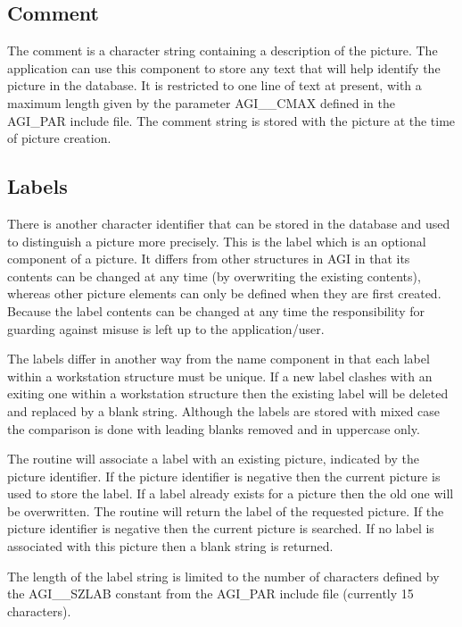 \documentclass[twoside,11pt]{starlink}
\begin{document}
\subsection{Comment}
The comment is a character string containing a description of the
picture. The application can use this component to store any text that
will help identify the picture in the database.
It is restricted to one line of text at present, with a maximum length
given by the parameter AGI\_\_CMAX defined in the AGI\_PAR include file.
The comment string is stored with the picture at the time of picture creation.

\subsection{Labels}\label{lab}
There is another character identifier that can be stored in the database
and used to distinguish a picture more precisely. This is the label which
is an optional component of a picture.
It differs from other structures in AGI in that its contents can be
changed at any time (by overwriting the existing contents), whereas
other picture elements can only be defined when they are first created.
Because the label contents can be changed at any time the responsibility
for guarding against misuse is left up to the application/user.

The labels differ in another way from the name component in that each
label within a workstation structure must be unique. If a new label clashes
with an exiting one within a workstation structure then the existing label
will be deleted and replaced by a blank string. Although the labels are
stored with mixed case the comparison is done with leading blanks removed
and in uppercase only.

The routine 
will associate a label with an existing picture,
indicated by the picture identifier. If the picture identifier is negative
then the current picture is used to store the label. If a label already
exists for a picture then the old one will be overwritten.
The routine 
will return the label of the requested picture.
If the picture identifier is negative then the current picture is searched.
If no label is associated with this picture then a blank string is returned.

The length of the label string is limited to the number of characters defined
by the AGI\_\_SZLAB constant from the AGI\_PAR include file
(currently 15 characters).
\end{document}
